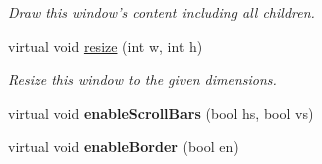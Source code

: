\begin{DoxyCompactItemize}
\begin{DoxyCompactList}\small\item\em Draw this window's content including all children. \end{DoxyCompactList}\item 
virtual void \hyperlink{classGUI_1_1WindowInWindow_a6ee682fe17ece1500d4b150b627efe48}{resize} (int w, int h)
\begin{DoxyCompactList}\small\item\em Resize this window to the given dimensions. \end{DoxyCompactList}\item 
\hypertarget{classGUI_1_1WindowInWindow_ae577d55445b2570da3755ae6912c66e0}{virtual void {\bfseries enable\-Scroll\-Bars} (bool hs, bool vs)}\label{classGUI_1_1WindowInWindow_ae577d55445b2570da3755ae6912c66e0}

\item 
\hypertarget{classGUI_1_1WindowInWindow_ae001aea9ade5258b7ac0d4df8c5b380c}{virtual void {\bfseries enable\-Border} (bool en)}\label{classGUI_1_1WindowInWindow_ae001aea9ade5258b7ac0d4df8c5b380c}

\end{DoxyCompactItemize}
